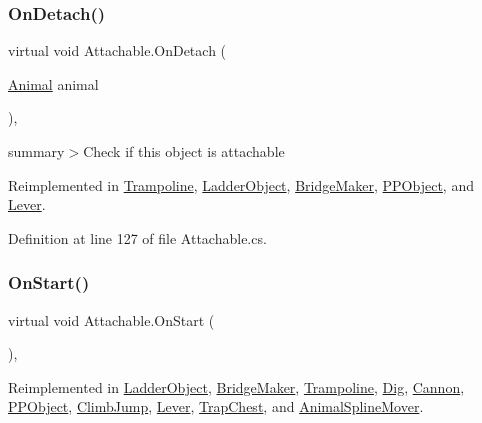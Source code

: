 \subsubsection{\texorpdfstring{On\+Detach()}{OnDetach()}}
{\footnotesize\ttfamily virtual void Attachable.\+On\+Detach (\begin{DoxyParamCaption}\item[{\mbox{\hyperlink{class_animal}{Animal}}}]{animal }\end{DoxyParamCaption})\hspace{0.3cm}{\ttfamily [protected]}, {\ttfamily [virtual]}}



summary$>$Check if this object is attachable



Reimplemented in \mbox{\hyperlink{class_trampoline_a2bb01ad135e9dfe5ad5685aaea9936c9}{Trampoline}}, \mbox{\hyperlink{class_ladder_object_a0d40bcecf87fe56cd97b5550d352e258}{Ladder\+Object}}, \mbox{\hyperlink{class_bridge_maker_a5d9583fb209bfca47eabb33ce0bbe1bf}{Bridge\+Maker}}, \mbox{\hyperlink{class_p_p_object_a2cf5c46651860b997fd937c30e29d6b8}{P\+P\+Object}}, and \mbox{\hyperlink{class_lever_abe5f0492971af0f479a638b39ed6e9d9}{Lever}}.



Definition at line 127 of file Attachable.\+cs.

\mbox{\label{class_attachable_a3c05c0b07b831881a7ab245057d34d30}} 
\subsubsection{\texorpdfstring{On\+Start()}{OnStart()}}
{\footnotesize\ttfamily virtual void Attachable.\+On\+Start (\begin{DoxyParamCaption}{ }\end{DoxyParamCaption})\hspace{0.3cm}{\ttfamily [protected]}, {\ttfamily [virtual]}}



Reimplemented in \mbox{\hyperlink{class_ladder_object_a2b6508ecfa48b616813c22c113650637}{Ladder\+Object}}, \mbox{\hyperlink{class_bridge_maker_a5aeea9e7555a542ec1d1fab4e3a9126f}{Bridge\+Maker}}, \mbox{\hyperlink{class_trampoline_a8ca649f9cd7a2ec2510ab39888c3dd16}{Trampoline}}, \mbox{\hyperlink{class_dig_a4363c202ea7096a10548d4fc5cb53c70}{Dig}}, \mbox{\hyperlink{class_cannon_ab530656c8ae8981ced0162cfdd8f9cb2}{Cannon}}, \mbox{\hyperlink{class_p_p_object_a365b36598fc60a7d6470147aae73121b}{P\+P\+Object}}, \mbox{\hyperlink{class_climb_jump_a094788a5de43e24f111eec10ba0a3c88}{Climb\+Jump}}, \mbox{\hyperlink{class_lever_af2c615a25c4a7296e38f5120173347c9}{Lever}}, \mbox{\hyperlink{class_trap_chest_a4579ba0a67f7426ffeea20df606c9ea7}{Trap\+Chest}}, and \mbox{\hyperlink{class_animal_spline_mover_aa088e9d7a088c6b2125a5388d13b95a7}{Animal\+Spline\+Mover}}.



